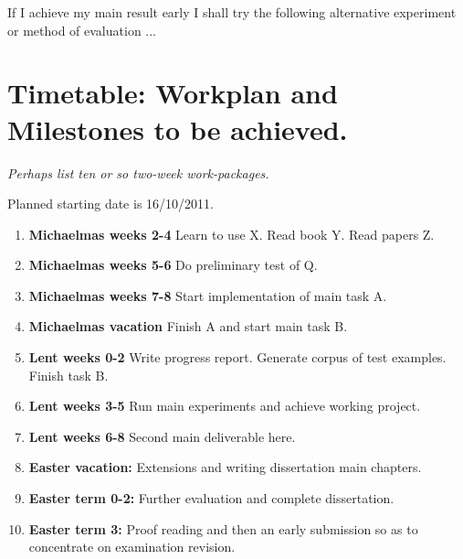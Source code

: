  If I achieve my main result early I shall try the following alternative
  experiment or method of evaluation ...

\section*{Timetable: Workplan and Milestones to be achieved.}

  {\em Perhaps list ten or so  two-week work-packages.}

  Planned starting date is 16/10/2011.

  \begin{enumerate}
    \item {\bf Michaelmas weeks 2-4} Learn to use X. Read book Y. Read papers
    Z.

    \item {\bf Michaelmas weeks 5-6} Do preliminary test of Q.

    \item {\bf Michaelmas weeks 7-8} Start implementation of main task A.

    \item {\bf Michaelmas vacation} Finish A and start main task B.

    \item {\bf Lent weeks 0-2} Write progress report. Generate corpus of test
    examples. Finish task B.

    \item {\bf Lent weeks 3-5} Run main experiments and achieve working
    project.

    \item {\bf Lent weeks 6-8} Second main deliverable here.

    \item {\bf Easter vacation:} Extensions and writing dissertation main
    chapters.

    \item {\bf Easter term 0-2:}  Further evaluation and complete dissertation.

    \item {\bf Easter term 3:} Proof reading and then an early submission so as
    to concentrate on examination revision.
  \end{enumerate}
